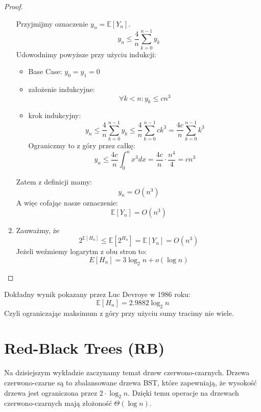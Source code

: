 \documentclass[11pt,a4paper]{article}
\begin{document}
\begin{proof}
\begin{enumerate}
            Przyjmijmy oznaczenie $y_n = \mathbb{E}[Y_n]$.
            \[
                y_n \leq \frac{4}{n} \sum_{k=0}^{n-1} y_k
            \]
            Udowodnimy powyższe przy użyciu indukcji:
            \begin{itemize}
                \item Base Case: $y_0=y_1=0$
                \item założenie indukcyjne:
                    \[
                        \forall k < n: y_k \leq cn^3
                    \]
                \item krok indukcyjny:
                    \[
                        y_n \leq \frac{4}{n} \sum_{k=0}^{n-1} y_k \leq \frac{4}{n} \sum_{k=0}^{n-1} c k^3 = \frac{4c}{n} \sum_{k=0}^{n-1} k^3
                    \]
                    Ograniczmy to z góry przez całkę:
                    \[
                        y_n \leq \frac{4c}{n} \int_0^{n} x^3 dx = \frac{4c}{n} \cdot \frac{n^4}{4} = cn^3
                    \]
            \end{itemize}
            Zatem z definicji mamy:
            \[
                y_n = O(n^3)
            \]
            A więc cofając nasze oznaczenie:
            \[
                \mathbb{E}[Y_n] = O(n^3)
            \]
        \item Zauważmy, że
            \[
                2^{\mathbb{E}[H_n]} \leq \mathbb{E}[2^{H_n}] = \mathbb{E}[Y_n] = O(n^3)
            \]
            Jeżeli weźmiemy logarytm z obu stron to:
            \[
                E[H_n] = 3 \log_2 n + o(\log n)
            \]
\end{enumerate}
\end{proof}
Dokładny wynik pokazany przez Luc Devroye w 1986 roku:
\[
    \mathbb{E}[H_n] = 2.9882 \log_2 n
\]
Czyli ograniczając maksimum z góry przy użyciu sumy tracimy nie wiele.


\section{Red-Black Trees (RB)}
Na dzisiejszym wykładzie zaczynamy temat drzew czerwono-czarnych. Drzewa czerwono-czarne są to zbalansowane drzewa BST, które zapewniają, że wysokość drzewa jest ograniczona przez $2 \cdot \log_2 n$. Dzięki temu operacje na drzewach czerwono-czarnych mają złożoność $\Theta(\log n)$.
\end{document}
